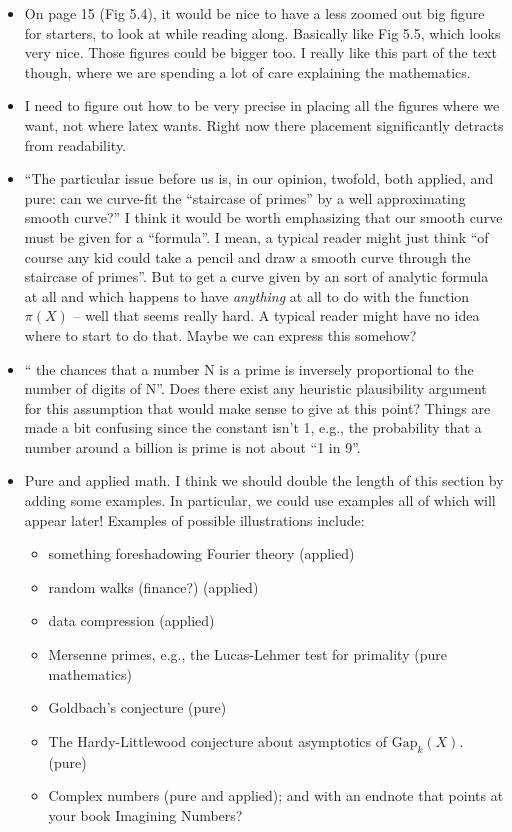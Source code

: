\documentclass{article}
\begin{document}
\begin{itemize}
\item On page 15 (Fig 5.4), it would be nice to have a less zoomed out
  big figure for starters, to look at while reading along.  Basically
  like Fig 5.5, which looks very nice.  Those figures could be bigger
  too.  I really like this part of the text though, where we are
  spending a lot of care explaining the mathematics.

\item I need to figure out how to be very precise in placing all the
  figures where we want, not where latex wants.  Right now there
  placement significantly detracts from readability.

\item ``The particular issue before us is, in our opinion, twofold,
  both applied, and pure: can we curve-fit the “staircase of primes”
  by a well approximating smooth curve?''  I think it would be worth
  emphasizing that our smooth curve must be given for a ``formula''.
  I mean, a typical reader might just think ``of course any kid could
  take a pencil and draw a smooth curve through the staircase of
  primes''.  But to get a curve given by an sort of analytic formula
  at all and which happens to have {\em anything } at all to do with
  the function $\pi(X)$ -- well that seems really hard.  A typical
  reader might have no idea where to start to do that.  Maybe we can
  express this somehow?  

\item `` the chances that a number N is a prime is inversely
  proportional to the number of digits of N''. Does there exist any
  heuristic plausibility argument for this assumption that would make
  sense to give at this point?  Things are made a bit confusing since
  the constant isn't 1, e.g., the probability that a number around a
  billion is prime is not about ``1 in 9''.

\item Pure and applied math.  I think we should double the length of
  this section by adding some examples.  In particular, we could use
  examples all of which will appear later!  Examples of possible
  illustrations include:
\begin{itemize}
  \item something foreshadowing Fourier theory (applied)
  \item random walks (finance?)  (applied)
  \item data compression (applied)
  \item Mersenne primes, e.g., the Lucas-Lehmer test for primality (pure mathematics)
  \item Goldbach's conjecture (pure)
  \item The Hardy-Littlewood conjecture about asymptotics of $\text{Gap}_k(X)$. (pure)
  \item Complex numbers (pure and applied); and with an endnote that
    points at your book Imagining Numbers?
  \end{itemize}
  

\end{itemize}
\end{document}
